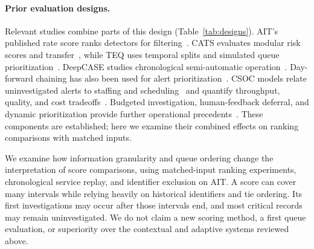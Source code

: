 \documentclass[pdflatex,sn-basic,Numbered]{sn-jnl}
\begin{document}
\paragraph{Prior evaluation designs.} Relevant studies combine parts of this design (Table~\ref{tab:designs}). AIT's published rate score ranks detectors for filtering~\citep{Landauer2024AITADS}. CATS evaluates modular risk scores and transfer~\citep{Uetz2026CATS}, while TEQ uses temporal splits and simulated queue prioritization~\citep{Gelman2023TEQ}. DeepCASE studies chronological semi-automatic operation~\citep{vanEde2022DeepCASE,Teuwen2025RulesetTuning}. Day-forward chaining has also been used for alert prioritization~\citep{Aminanto2020DayForward}. CSOC models relate uninvestigated alerts to staffing and scheduling~\citep{Ganesan2017OperationalEffectiveness} and quantify throughput, quality, and cost tradeoffs~\citep{Shah2019Tradeoffs}. Budgeted investigation, human-feedback deferral, and dynamic prioritization provide further operational precedents~\citep{Tong2020MovingHaystack,Jalalvand2025L2DHF,KimDan2025Dynamic}. These components are established; here we examine their combined effects on ranking comparisons with matched inputs.

We examine how information granularity and queue ordering change the interpretation of score comparisons, using matched-input ranking experiments, chronological service replay, and identifier exclusion on AIT. A score can cover many intervals while relying heavily on historical identifiers and tie ordering. Its first investigations may occur after those intervals end, and most critical records may remain uninvestigated. We do not claim a new scoring method, a first queue evaluation, or superiority over the contextual and adaptive systems reviewed above.
\end{document}
